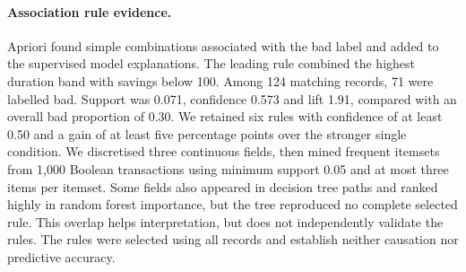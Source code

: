 \paragraph{Association rule evidence.}\label{sec:apriori} Apriori found simple combinations associated with the bad label and added to the supervised model explanations. The leading rule combined the highest duration band with savings below 100. Among 124 matching records, 71 were labelled bad. Support was 0.071, confidence 0.573 and lift 1.91, compared with an overall bad proportion of 0.30. We retained six rules with confidence of at least 0.50 and a gain of at least five percentage points over the stronger single condition. We discretised three continuous fields, then mined frequent itemsets from 1,000 Boolean transactions using minimum support 0.05 and at most three items per itemset. Some fields also appeared in decision tree paths and ranked highly in random forest importance, but the tree reproduced no complete selected rule. This overlap helps interpretation, but does not independently validate the rules. The rules were selected using all records and establish neither causation nor predictive accuracy.
